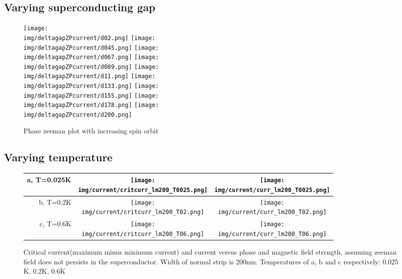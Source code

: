 \documentclass[10pt,a4paper]{article}
\newcommand{\img}{./images}
\begin{document}
	\subsection{Varying superconducting gap}
		\begin{figure}[H]
			\texttt{[image: \\img/deltagapZPcurrent/d02.png]}
			\texttt{[image: \\img/deltagapZPcurrent/d045.png]}
			\texttt{[image: \\img/deltagapZPcurrent/d067.png]}
			\texttt{[image: \\img/deltagapZPcurrent/d089.png]}
			\texttt{[image: \\img/deltagapZPcurrent/d11.png]}
			\texttt{[image: \\img/deltagapZPcurrent/d133.png]}
			\texttt{[image: \\img/deltagapZPcurrent/d155.png]}
			\texttt{[image: \\img/deltagapZPcurrent/d178.png]}
			\texttt{[image: \\img/deltagapZPcurrent/d200.png]}
			\caption{Phase zeeman plot with increasing spin orbit}
		\end{figure}
	\subsection{Varying temperature}
		\begin{figure}
			\begin{tabular}{rcc}
				a, T=0.025K&\texttt{[image: \\img/current/critcurr\_lm200\_T0025.png]}&
				\texttt{[image: \\img/current/curr\_lm200\_T0025.png]}\\
				\hline
				b, T=0.2K&\texttt{[image: \\img/current/critcurr\_lm200\_T02.png]}&
				\texttt{[image: \\img/current/curr\_lm200\_T02.png]}\\
				\hline
				c, T=0.6K&\texttt{[image: \\img/current/critcurr\_lm200\_T06.png]}&
				\texttt{[image: \\img/current/curr\_lm200\_T06.png]}\\
				\hline
			\end{tabular}
			\caption{Critical current(maximum minus minimum current) and current versus phase and magnetic field strength, assuming zeeman field does not persists in the superconductor. Width of normal strip is 200nm. Temperatures of a, b and c respectively: 0.025 K, 0.2K, 0.6K}
		\end{figure}
	
\end{document}
